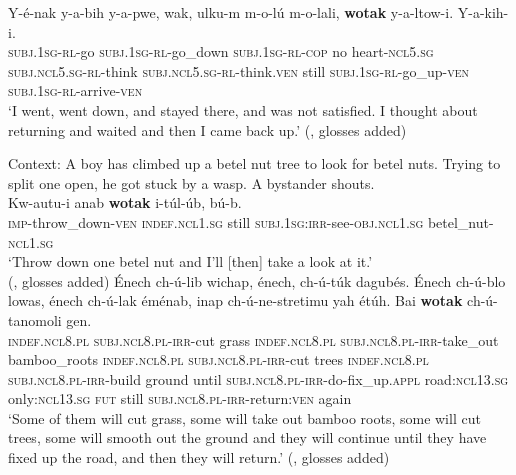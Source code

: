 \begin{exe}
	\ex\label{exAppendixBukiyipSequencing1}
	\gll Y-é-nak y-a-bih y-a-pwe, wak, ulku-m m-o-lú m-o-lali, \textbf{wotak} y-a-ltow-i. Y-a-kih-i.\\
	\textsc{subj}.1\textsc{sg}-\textsc{rl}-go \textsc{subj}.1\textsc{sg}-\textsc{rl}-go\_down \textsc{subj}.1\textsc{sg}-\textsc{rl}-\textsc{cop} no heart-\textsc{ncl}5.\textsc{sg} \textsc{subj}.\textsc{ncl}5.\textsc{sg}-\textsc{rl}-think \textsc{subj}.\textsc{ncl}5.\textsc{sg}-\textsc{rl}-think.\textsc{ven} still \textsc{subj}.1\textsc{sg}-\textsc{rl}-go\_up-\textsc{ven} \textsc{subj}.1\textsc{sg}-\textsc{rl}-arrive-\textsc{ven} \\
	\glt \lq I went, went down, and stayed there, and was not satisfied. I thought about returning and waited and then I came back up.' (\cite[168]{ConradWigoga1991}, glosses added)


	\ex\label{exAppendixBukiyipSequencing2}
	Context: A boy has climbed up a betel nut tree to look for betel nuts. Trying to split one open, he got stuck by a wasp. A bystander shouts.\\
	\gll Kw-autu-i anab \textbf{wotak} i-túl-úb, bú-b.\\
	\textsc{imp}-throw\_down-\textsc{ven} \textsc{indef}.\textsc{ncl}1.\textsc{sg} still \textsc{subj}.1\textsc{sg}:\textsc{irr}-see-\textsc{obj}.\textsc{ncl}1.\textsc{sg} betel\_nut-\textsc{ncl}1.\textsc{sg}\\
	\glt \lq Throw down one betel nut and I’ll [then] take a look at it.'\\ (\cite[233]{ConradWigoga1991}, glosses added)
	\pagebreak
	\ex\label{exAppendixBukiyipSequencing3}
	 \gll Énech ch-ú-lib wichap, énech, ch-ú-túk dagubés. Énech ch-ú-blo lowas, énech ch-ú-lak éménab, inap ch-ú-ne-stretimu yah étúh. Bai \textbf{wotak} ch-ú-tanomoli gen.\\
	\textsc{indef}.\textsc{ncl}8.\textsc{pl} \textsc{subj}.\textsc{ncl}8.\textsc{pl}-\textsc{irr}-cut grass \textsc{indef}.\textsc{ncl}8.\textsc{pl} \textsc{subj}.\textsc{ncl}8.\textsc{pl}-\textsc{irr}-take\_out bamboo\_roots \textsc{indef}.\textsc{ncl}8.\textsc{pl} \textsc{subj}.\textsc{ncl}8.\textsc{pl}-\textsc{irr}-cut trees \textsc{indef}.\textsc{ncl}8.\textsc{pl} \textsc{subj}.\textsc{ncl}8.\textsc{pl}-\textsc{irr}-build ground until \textsc{subj}.\textsc{ncl}8.\textsc{pl}-\textsc{irr}-do-fix\_up.\textsc{appl} road:\textsc{ncl}13.\textsc{sg} only:\textsc{ncl}13.\textsc{sg} \textsc{fut} still \textsc{subj}.\textsc{ncl}8.\textsc{pl}-\textsc{irr}-return:\textsc{ven} again\\
	\glt \lq Some of them will cut grass, some will take out bamboo roots, some will cut trees, some will smooth out the ground and they will continue until they have fixed up the road, and then they will return.' (\cite[126]{ConradWigoga1991}, glosses added)
\end{exe} 

